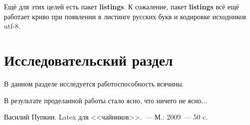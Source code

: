 \documentclass[utf8]{G7-32} %
\newcommand{\Code}[1]{\textbf{#1}}
\begin{document}
Ещё для этих целей есть пакет \Code{listings}. К сожаление, пакет \Code{listings} всё ещё работает криво при появлении в листинге русских букв и кодировке исходников utf-8. 

\chapter{Исследовательский раздел}

В данном разделе исследуется работоспособность всячины.

\backmatter %

\Conclusion %

В результате проделанной работы стало ясно, что ничего не ясно...
%
\begin{thebibliography}{99}
 Василий Пупкин. Latex для <<чайников>>.~--- М.: 2009~--- 50 c.
\end{thebibliography}
\end{document}
